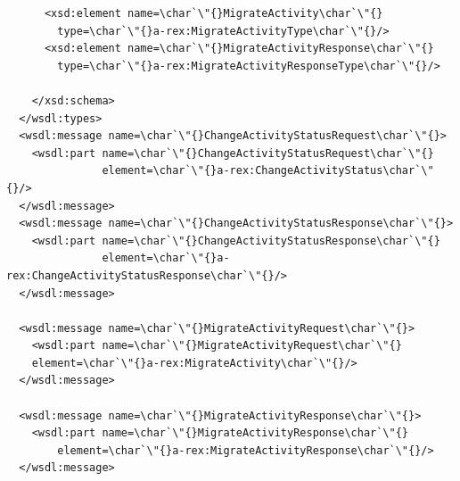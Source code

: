 \documentclass{article}                            %
\begin{document}
\begin{footnotesize}
\begin{verbatim}
      <xsd:element name=\char`\"{}MigrateActivity\char`\"{}
        type=\char`\"{}a-rex:MigrateActivityType\char`\"{}/>
      <xsd:element name=\char`\"{}MigrateActivityResponse\char`\"{}
        type=\char`\"{}a-rex:MigrateActivityResponseType\char`\"{}/>

    </xsd:schema>
  </wsdl:types>
  <wsdl:message name=\char`\"{}ChangeActivityStatusRequest\char`\"{}>
    <wsdl:part name=\char`\"{}ChangeActivityStatusRequest\char`\"{}
               element=\char`\"{}a-rex:ChangeActivityStatus\char`\"{}/>
  </wsdl:message>
  <wsdl:message name=\char`\"{}ChangeActivityStatusResponse\char`\"{}>
    <wsdl:part name=\char`\"{}ChangeActivityStatusResponse\char`\"{}
               element=\char`\"{}a-rex:ChangeActivityStatusResponse\char`\"{}/>
  </wsdl:message>
  
  <wsdl:message name=\char`\"{}MigrateActivityRequest\char`\"{}>
    <wsdl:part name=\char`\"{}MigrateActivityRequest\char`\"{} 
	element=\char`\"{}a-rex:MigrateActivity\char`\"{}/>
  </wsdl:message>

  <wsdl:message name=\char`\"{}MigrateActivityResponse\char`\"{}>
    <wsdl:part name=\char`\"{}MigrateActivityResponse\char`\"{} 
        element=\char`\"{}a-rex:MigrateActivityResponse\char`\"{}/>
  </wsdl:message>


\end{verbatim}
\end{footnotesize}
\end{document}
